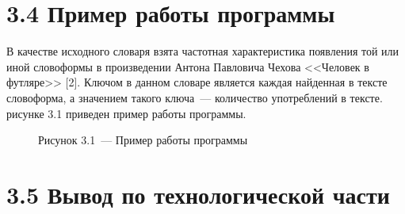 \documentclass[12pt, a4paper]{report}
\begin{document}
	\section*{3.4 Пример работы программы}
	
	В качестве исходного словаря взята частотная характеристика появления той или иной словоформы в произведении Антона Павловича Чехова <<Человек в футляре>> [2]. Ключом в данном словаре является каждая найденная в тексте словоформа, а значением такого ключа~--- количество употреблений в тексте.
	 рисунке 3.1 приведен пример работы программы.
	
	\begin{figure}[H]
		\caption*{Рисунок 3.1~--- Пример работы программы}
	\end{figure}
	
	\section*{3.5 Вывод по технологической части}
	
\end{document}

